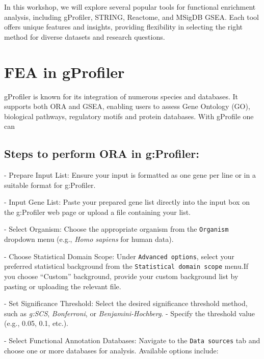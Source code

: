 \documentclass[
]{book}
\begin{document}
In this workshop, we will explore several popular tools for functional enrichment analysis, including gProfiler, STRING, Reactome, and MSigDB GSEA. Each tool offers unique features and insights, providing flexibility in selecting the right method for diverse datasets and research questions.

\hypertarget{fea-in-gprofiler}{%
\section{\texorpdfstring{FEA in gProfiler }{FEA in gProfiler }}\label{fea-in-gprofiler}}

gProfiler is known for its integration of numerous species and databases. It supports both ORA and GSEA, enabling users to assess Gene Ontology (GO), biological pathways, regulatory motifs and protein databases. With gProfile one can

\hypertarget{steps-to-perform-ora-in-gprofiler}{%
\subsection{Steps to perform ORA in g:Profiler:}\label{steps-to-perform-ora-in-gprofiler}}

{- Prepare Input List:} Ensure your input is formatted as one gene per line or in a suitable format for g:Profiler.

{- Input Gene List:} Paste your prepared gene list directly into the input box on the g:Profiler web page or upload a file containing your list.

{- Select Organism:} Choose the appropriate organism from the \texttt{Organism} dropdown menu (e.g., \emph{Homo sapiens} for human data).

{- Choose Statistical Domain Scope:} Under \texttt{Advanced\ options}, select your preferred statistical background from the \texttt{Statistical\ domain\ scope} menu.If you choose ``Custom'' background, provide your custom background list by pasting or uploading the relevant file.

{- Set Significance Threshold:} Select the desired significance threshold method, such as \emph{g:SCS}, \emph{Bonferroni}, or \emph{Benjamini-Hochberg}.
- Specify the threshold value (e.g., 0.05, 0.1, etc.).

{- Select Functional Annotation Databases: } Navigate to the \texttt{Data\ sources} tab and choose one or more databases for analysis. Available options include:
\end{document}
